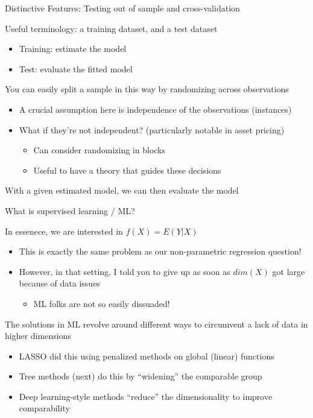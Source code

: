 \documentclass[notes,11pt, aspectratio=169]{beamer}
\newenvironment{wideitemize}{\itemize\addtolength{\itemsep}{10pt}}{\enditemize}
\begin{document}
\begin{frame}{Distinctive Features: Testing out of sample and cross-validation}
  \begin{wideitemize}
  \item Useful terminology: a training dataset, and a test dataset
    \begin{itemize}
    \item Training: estimate the model
    \item Test: evaluate the fitted model
    \end{itemize}
  \item You can easily split a sample in this way by randomizing across observations
    \begin{itemize}
    \item A crucial assumption here is independence of the observations (instances)
    \item What if they're not independent? (particularly notable in asset pricing)
      \begin{itemize}
      \item Can consider randomizing in blocks
      \item Useful to have a theory that guides these decisions
      \end{itemize}
    \end{itemize}
  \item With a given estimated model, we can then evaluate the model 
  \end{wideitemize}
\end{frame}



\begin{frame}{What is supervised learning / ML?}
  \begin{wideitemize}
  \item In essenece, we are interested in $f(X) = E(Y | X)$
    \begin{itemize}
    \item This is exactly the same problem as our non-parametric regression question!
    \item However, in that setting, I told you to give up as soon as $dim(X)$ got large because of data issues
      \begin{itemize}
      \item ML folks are not so easily dissuaded!
      \end{itemize}
    \end{itemize}
  \item The solutions in ML revolve around different ways to circumvent a lack of data in higher dimensions
    \begin{itemize}
    \item LASSO did this using penalized methods on global (linear) functions
    \item Tree methods (next) do this by ``widening'' the comparable group
    \item Deep learning-style methods ``reduce'' the dimensionality to improve comparability
    \end{itemize}
  \end{wideitemize}
\end{frame}
\end{document}
